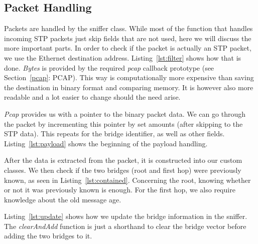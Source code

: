 \subsection{Packet Handling}
\label{packet_handling}
Packets are handled by the sniffer class.
While most of the function that handles incoming STP packets just skip fields that are not used, here we will discuss the more important parts.
In order to check if the packet is actually an STP packet, we use the Ethernet destination address.
Listing~\ref{lst:filter} shows how that is done.
\textit{Bytes} is provided by the required \textit{pcap} callback prototype (see Section~\ref{pcap}: PCAP).
This way is computationally more expensive than saving the destination in binary format and comparing memory.
It is however also more readable and a lot easier to change should the need arise.


\textit{Pcap} provides us with a pointer to the binary packet data.
We can go through the packet by incrementing this pointer by set amounts (after skipping to the STP data).
This repeats for the bridge identifier, as well as other fields.
Listing~\ref{lst:payload} shows the beginning of the payload handling.


After the data is extracted from the packet, it is constructed into our custom classes.
We then check if the two bridges (root and first hop) were previously known, as seen in Listing~\ref{lst:contained}.
Concerning the root, knowing whether or not it was previously known is enough.
For the first hop, we also require knowledge about the old message age.


Listing~\ref{lst:update} shows how we update the bridge information in the sniffer.
The \textit{clearAndAdd} function is just a shorthand to clear the bridge vector before adding the two bridges to it.

